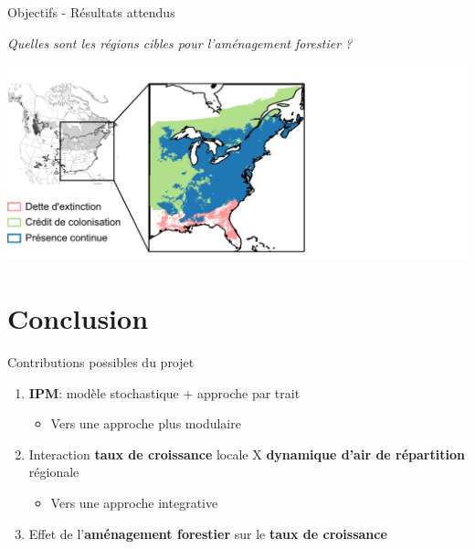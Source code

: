 \documentclass[11pt, compress, aspectratio=1610]{beamer}
\providecommand{\tightlist}{%
  \setlength{\itemsep}{0pt}\setlength{\parskip}{0pt}}
\begin{document}
\begin{frame}{Objectifs - Résultats attendus}
\protect\hypertarget{objectifs---ruxe9sultats-attendus-5}{}

\centering

\emph{Quelles sont les régions cibles pour l’aménagement forestier ?}

\centering

\includegraphics[scale=0.4]{figures/Talluto0.png}\hspace*{-4cm}

\par

\end{frame}

\hypertarget{conclusion}{%
\section{Conclusion}\label{conclusion}}

\begin{frame}{Contributions possibles du projet}
\protect\hypertarget{contributions-possibles-du-projet}{}

\begin{enumerate}
[1.]
\tightlist
\item
  \textbf{IPM}: modèle stochastique + approche par trait

  \begin{itemize}
  \tightlist
  \item
    Vers une approche plus modulaire
  \end{itemize}
\item
  Interaction \textbf{taux de croissance} locale X \textbf{dynamique
  d’air de répartition} régionale

  \begin{itemize}
  \tightlist
  \item
    Vers une approche integrative
  \end{itemize}
\item
  Effet de l’\textbf{aménagement forestier} sur le \textbf{taux de
  croissance}
\end{enumerate}

\end{frame}
\end{document}

